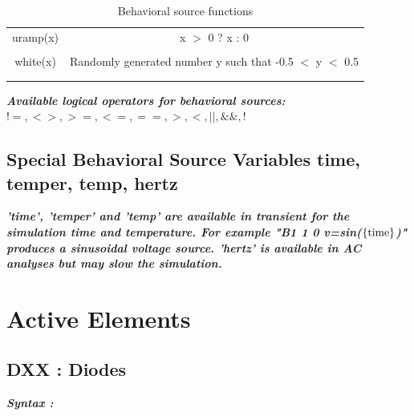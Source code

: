 \begin{longtable}{c c}
uramp(x) & \begin{minipage}{20em}
x $>$ 0 ? x : 0
\end{minipage}\\ \\

white(x) & \begin{minipage}{20em}
Randomly generated number y such that -0.5 $<$ y $<$ 0.5
\end{minipage}\\ \\[1ex] %
\hline %

\caption{Behavioral source functions}
\label {tab:paramfuncs}
\end{longtable}

\textbf{\textit{Available logical operators for behavioral sources: $!=, <>, >=, <=, ==, >, <, ||, \&\&, !$ }}

\subsection{Special Behavioral Source Variables time, temper, temp, hertz}
\textbf{\textit{'time', 'temper' and 'temp' are available in transient for the simulation time and temperature. For example "B1 1 0 v=sin($\rm{\left\{time\right\}}$)" produces a sinusoidal voltage source. 'hertz' is available in AC analyses but may slow the simulation.}}

\newpage
\section{Active Elements}
\label{sec_sceadm_activeelements}

\subsection{DXX : Diodes}
\label{subsec_sceadm_diodes}

\textbf{\textit{Syntax :}}


